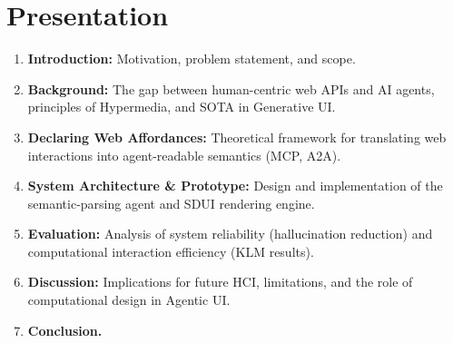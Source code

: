 \documentclass[12pt,a4paper,english,oneside]{article}
\begin{document}
\section{Presentation}




\begin{enumerate}
    \item \textbf{Introduction:} Motivation, problem statement, and scope.
    \item \textbf{Background:} The gap between human-centric web APIs and AI agents, principles of Hypermedia, and SOTA in Generative UI.
    \item \textbf{Declaring Web Affordances:} Theoretical framework for translating web interactions into agent-readable semantics (MCP, A2A).
    \item \textbf{System Architecture \& Prototype:} Design and implementation of the semantic-parsing agent and SDUI rendering engine.
    \item \textbf{Evaluation:} Analysis of system reliability (hallucination reduction) and computational interaction efficiency (KLM results).
    \item \textbf{Discussion:} Implications for future HCI, limitations, and the role of computational design in Agentic UI.
    \item \textbf{Conclusion.}
\end{enumerate}



\end{document}
